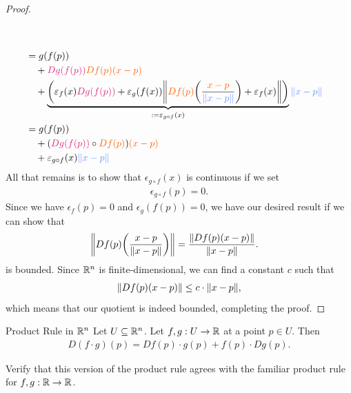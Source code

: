 \begin{proof}
\begin{align*}
{		}
		\\
	\\
		&=
		g(f(p))\\ 
		&\+ 
		\tc{c3}{Dg(f(p))}\tc{c4}{Df(p)(x-p)}\\
		&\+ 
		\underbrace{
			\lr(\epsilon_f(x)\tc{c3}{Dg(f(p))}
			+ 
			\epsilon_g(f(x))
			\norm{\tc{c4}{Df(p)} \lr(\frac{\tc{c4}{x-p}}{\tc{c1}{\norm{x-p}}}) + \epsilon_f(x)})
		}
		_
		{:= \epsilon_{g \circ f}(x)}
		\tc{c1}{\norm{x - p}}
	\\
		&=
		g(f(p))\\ 
		&\+ (\tc{c3}{Dg(f(p))} \circ \tc{c4}{Df(p)})\tc{c4}{(x-p)}\\
		&\+ \epsilon_{g \circ f}(x)\tc{c1}{\norm{x - p}} 
	\end{align*}
	All that remains is to show that $\epsilon_{g \circ f}(x)$ is continuous if we set
	\begin{align*}
		\epsilon_{g \circ f}(p) = 0.
	\end{align*}
	Since we have $\epsilon_f(p) = 0$ and $\epsilon_g(f(p)) = 0$, we have our desired result if we can show that 
	\begin{align*}
		\norm{Df(p) \qty(\frac{x - p}{\norm{x-p}})}
		&=
		\frac{\norm{Df(p)(x-p)}}{\norm{x-p}}.
	\end{align*}
	is bounded.
	Since $\mathbb{R}^n$ is finite-dimensional, we can find a constant $c$ such that
	\begin{align*}
		\norm{Df(p)(x-p)} \leq c \cdot \norm{x-p},
	\end{align*}
	which means that our quotient is indeed bounded, completing the proof.
\end{proof}
\begin{importanttheorem}{Product Rule in $\mathbb{R}^n$}{}
	Let $U \subseteq \mathbb{R}^n$. Let $f,g : U \to \mathbb{R}$ at a point $p \in U$. Then
	\begin{align*}
		D(f \cdot g)(p) = Df(p) \cdot g(p) + f(p) \cdot Dg(p).
	\end{align*}
\end{importanttheorem}
\begin{exercise}
	Verify that this version of the product rule agrees with the familiar product rule for $f,g : \mathbb{R} \to \mathbb{R}$.
\end{exercise}
